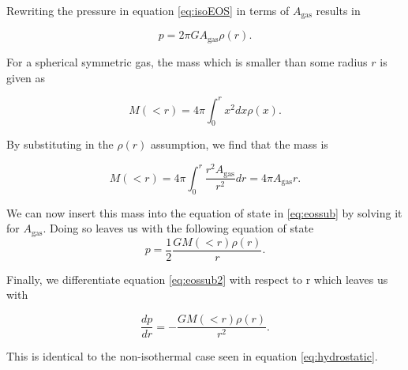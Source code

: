 \documentclass[a4paper]{article}
\begin{document}
\noindent Rewriting the pressure in equation \eqref{eq:isoEOS} in terms of $ A_\text{gas} $
results in

\begin{equation}\label{eq:eossub}
    p = 2\pi G  A_\text{gas}  \rho (r).
\end{equation}

\noindent For a spherical symmetric gas, the mass which is smaller than some radius $r$
is given as

\begin{equation}\label{eq:mass}
    M (<r) = 4\pi \int_0^r x^2 dx \rho(x).
\end{equation}

\noindent By substituting in the $\rho(r)$ assumption, we find that the mass is 

\begin{equation}\label{eq:mass res}
    M(<r) = 4\pi \int_0^r \frac{r^2 A_\mathrm{gas}}{r^2}dr = 4\pi A_\mathrm{gas} r.
\end{equation}

\noindent We can now insert this mass into the equation of state in \eqref{eq:eossub} by solving it for $A_\textrm{gas}$. Doing so leaves us with the following equation of state
\begin{equation}\label{eq:eossub2}
    p = \frac{1}{2} \frac{G M (<r) \rho (r)}{r}.
\end{equation}

\noindent Finally, we differentiate equation \eqref{eq:eossub2} with respect to r which leaves us with 

\begin{equation}\label{eq:isohydro}
    \frac{dp}{dr} = -\frac{GM(<r) \rho(r)}{r^2}.
\end{equation}

\noindent This is identical to the non-isothermal case seen in equation
\eqref{eq:hydrostatic}.
\end{document}
